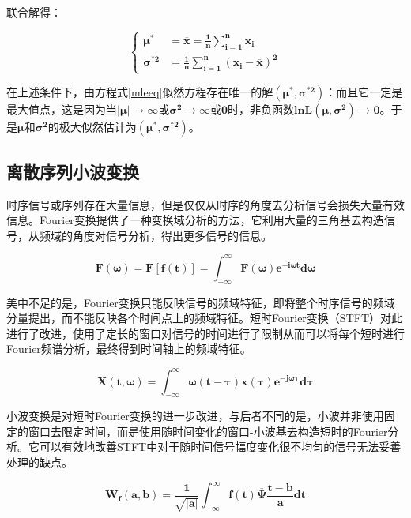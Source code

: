 \documentclass[a4paper,AutoFakeBold,oneside,12pt]{book}
\begin{document}
	联合解得：

	\begin{equation}
	\label{mleeq}
	\begin{cases} 
	\bm{\mu^*}&=\bm{\overline{x}}=\bm{\frac{1}{n}\sum_{i=1}^n {x}_i} \\
	\bm{\sigma^{*2}}&=\bm{\frac{1}{n}\sum_{i=1}^n ({x}_i-\overline{x})^2}
	\end{cases}	
	\end{equation}

	在上述条件下，由方程式\ref{mleeq}似然方程存在唯一的解$\bm{(\mu^*,\sigma^{*2})}$：而且它一定是最大值点，这是因为当$\bm{|\mu|}\to\bm{\infty}$或$\bm{\sigma^2}\to\bm{\infty}$或$\bm{0}$时，非负函数$\bm{lnL(\mu,\sigma^2)}\to\bm{0}$。于是$\bm{\mu}$和$\bm{\sigma^{2}}$的极大似然估计为$\bm{(\mu^*,\sigma^{*2})}$。

\subsection{离散序列小波变换}

	时序信号或序列存在大量信息，但是仅仅从时序的角度去分析信号会损失大量有效信息。Fourier变换提供了一种变换域分析的方法，它利用大量的三角基去构造信号，从频域的角度对信号分析，得出更多信号的信息。

	\begin{equation}
	\bm{F(\omega)}=\bm{F[f(t)]}=\bm{\int_{-\infty}^{\infty} F(\omega)e^{-i\omega t} d\omega}
	\end{equation}

	美中不足的是，Fourier变换只能反映信号的频域特征，即将整个时序信号的频域分量提出，而不能反映各个时间点上的频域特征。短时Fourier变换（STFT）对此进行了改进，使用了定长的窗口对信号的时间进行了限制从而可以将每个短时进行Fourier频谱分析，最终得到时间轴上的频域特征。

	\begin{equation}
	\bm{X(t,\omega)}=\bm{\int_{-\infty}^{\infty} \omega(t-\tau)x(\tau)e^{-j\omega\tau} d\tau}
	\end{equation}

	小波变换是对短时Fourier变换的进一步改进\cite{portnoff1980time}，与后者不同的是，小波并非使用固定的窗口去限定时间，而是使用随时间变化的窗口-小波基去构造短时的Fourier分析。它可以有效地改善STFT中对于随时间信号幅度变化很不均匀的信号无法妥善处理的缺点。

	\begin{equation}
	\bm{W_f (a,b)}=\bm{\frac{1}{\sqrt{|a|}}\int_{-\infty}^{\infty}f(t)\overline{\Psi}\frac{t-b}{a}dt}
	\end{equation}
\end{document}
